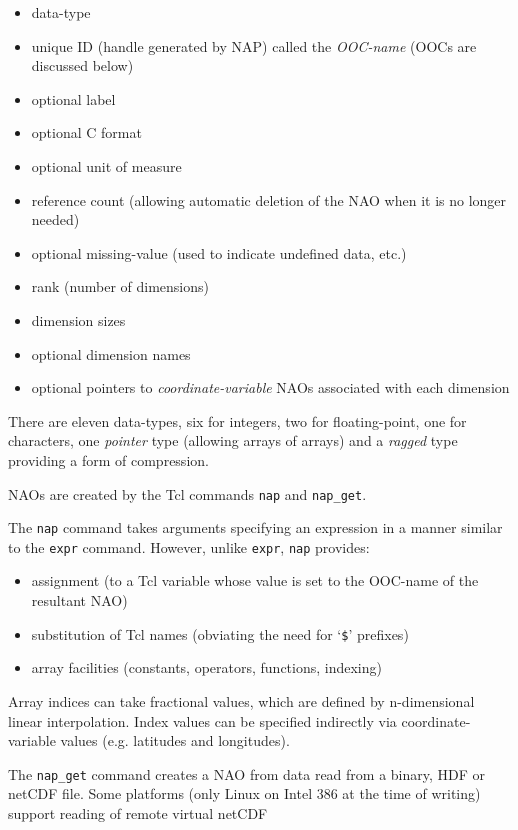   \begin{itemize}
    \item data-type
    \item unique ID (handle generated by NAP) called the 
    \emph{OOC-name} (OOCs are discussed below)
    \item optional label
    \item optional C format
    \item optional unit of measure
    \item reference count (allowing automatic deletion of the NAO when it
    is no longer needed)
    \item optional missing-value (used to indicate undefined data,
    etc.)
    \item rank (number of dimensions)
    \item dimension sizes
    \item optional dimension names
    \item optional pointers to 
    \emph{coordinate-variable} NAOs associated with each
    dimension
  \end{itemize}There are eleven data-types, six for integers, two for
  floating-point, one for characters, one 
  \emph{pointer} type (allowing arrays of arrays) and a 
  \emph{ragged} type providing a form of compression.
  \par NAOs are created by the Tcl commands 
  \texttt{nap} and 
  \texttt{nap\_get}.
  \par The 
  \texttt{nap} command takes arguments specifying an expression in
  a manner similar to the 
  \texttt{expr} command. However, unlike 
  \texttt{expr}, 
  \texttt{nap} provides:
  \begin{itemize}
    \item assignment (to a Tcl variable whose value is set to the
    OOC-name of the resultant NAO)
    \item substitution of Tcl names (obviating the need for `\texttt{\$}' prefixes)
    \item array facilities (constants, operators, functions,
    indexing)
  \end{itemize}Array indices can take fractional values, which are defined by
  n-dimensional linear interpolation. Index values can be specified
  indirectly via coordinate-variable values (e.g. latitudes and
  longitudes).
  \par The 
  \texttt{nap\_get} command creates a NAO from data read from a
  binary, HDF or netCDF file. Some platforms (only Linux on Intel 386
  at the time of writing) support reading of remote virtual netCDF
